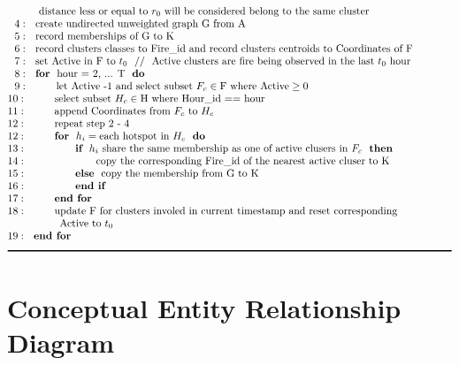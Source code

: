 \documentclass{monashthesis}
\begin{document}
\begin{table}
\begin{align*}
&~~~~~~~~~\text{distance less or equal to }r_0~\text{will be considered belong to the same cluster} \\[-1\jot]
&~~4:~~\text{create undirected unweighted graph G from A}\\[-1\jot]
&~~5:~~\text{record memberships of G to K}\\[-1\jot]
&~~6:~~\text{record clusters classes to Fire\textunderscore id and record clusters centroids to Coordinates of F}\\[-1\jot]
&~~7:~~\text{set Active in F to }t_0~~//~~\text{Active clusters are fire being observed in the last }t_0~\text{hour}\\[-1\jot]
&~~8:~~\textbf{for}~~\text{hour = 2, ... T}~~\textbf{do} \\[-1\jot]
&~~9:~~~~~~~~\text{let Active -1 and select subset }F_c \in \text{F where Active} \geq 0\\[-1\jot]
&10:~~~~~~~~\text{select subset }H_c \in \text{H where Hour\textunderscore id == hour}\\[-1\jot]
&11:~~~~~~~~\text{append Coordinates from }F_c~\text{to}~H_c\\[-1\jot]
&12:~~~~~~~~\text{repeat step 2 - 4}\\[-1\jot]
&12:~~~~~~~~\textbf{for}~~h_i = \text{each hotspot in }H_c~~\textbf{do}\\[-1\jot]
&13:~~~~~~~~~~~~~~\textbf{if}~~h_i~\text{share the same membership as one of active clusers in }F_c~~\textbf{then}\\[-1\jot]
&14:~~~~~~~~~~~~~~~~~~~~\text{copy the corresponding Fire\textunderscore id of the nearest active cluser to K}\\[-1\jot]
&15:~~~~~~~~~~~~~~\textbf{else}~~\text{copy the membership from G to K}\\[-1\jot]
&16:~~~~~~~~~~~~~~\textbf{end if}\\[-1\jot]
&17:~~~~~~~~\textbf{end for}\\[-1\jot]
&18:~~~~~~~~\text{update F for clusters involed in current timestamp and reset corresponding}\\[-1\jot]
&~~~~~~~~~~~~~~~\text{Active to }t_0\\[-1\jot]
&19:~~\textbf{end for}\\[-1\jot]
&\rule{150mm}{0.5mm}
\end{align*}
\end{table}

\section{Conceptual Entity Relationship
Diagram}\label{conceptual-entity-relationship-diagram}
\end{document}
